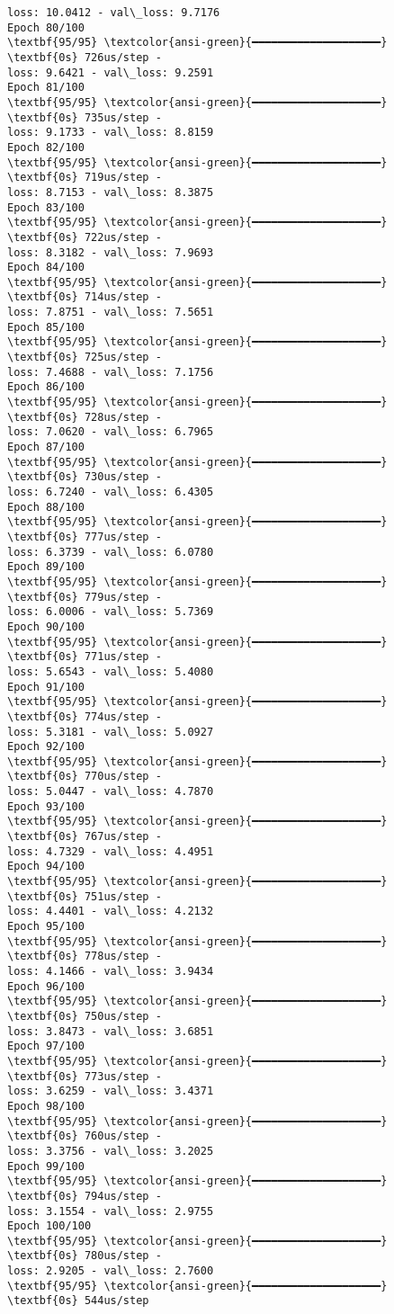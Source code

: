 \documentclass[11pt]{article}
\begin{document}
\begin{Verbatim}[commandchars=\\\{\}]
loss: 10.0412 - val\_loss: 9.7176
Epoch 80/100
\textbf{95/95} \textcolor{ansi-green}{━━━━━━━━━━━━━━━━━━━━} \textbf{0s} 726us/step -
loss: 9.6421 - val\_loss: 9.2591
Epoch 81/100
\textbf{95/95} \textcolor{ansi-green}{━━━━━━━━━━━━━━━━━━━━} \textbf{0s} 735us/step -
loss: 9.1733 - val\_loss: 8.8159
Epoch 82/100
\textbf{95/95} \textcolor{ansi-green}{━━━━━━━━━━━━━━━━━━━━} \textbf{0s} 719us/step -
loss: 8.7153 - val\_loss: 8.3875
Epoch 83/100
\textbf{95/95} \textcolor{ansi-green}{━━━━━━━━━━━━━━━━━━━━} \textbf{0s} 722us/step -
loss: 8.3182 - val\_loss: 7.9693
Epoch 84/100
\textbf{95/95} \textcolor{ansi-green}{━━━━━━━━━━━━━━━━━━━━} \textbf{0s} 714us/step -
loss: 7.8751 - val\_loss: 7.5651
Epoch 85/100
\textbf{95/95} \textcolor{ansi-green}{━━━━━━━━━━━━━━━━━━━━} \textbf{0s} 725us/step -
loss: 7.4688 - val\_loss: 7.1756
Epoch 86/100
\textbf{95/95} \textcolor{ansi-green}{━━━━━━━━━━━━━━━━━━━━} \textbf{0s} 728us/step -
loss: 7.0620 - val\_loss: 6.7965
Epoch 87/100
\textbf{95/95} \textcolor{ansi-green}{━━━━━━━━━━━━━━━━━━━━} \textbf{0s} 730us/step -
loss: 6.7240 - val\_loss: 6.4305
Epoch 88/100
\textbf{95/95} \textcolor{ansi-green}{━━━━━━━━━━━━━━━━━━━━} \textbf{0s} 777us/step -
loss: 6.3739 - val\_loss: 6.0780
Epoch 89/100
\textbf{95/95} \textcolor{ansi-green}{━━━━━━━━━━━━━━━━━━━━} \textbf{0s} 779us/step -
loss: 6.0006 - val\_loss: 5.7369
Epoch 90/100
\textbf{95/95} \textcolor{ansi-green}{━━━━━━━━━━━━━━━━━━━━} \textbf{0s} 771us/step -
loss: 5.6543 - val\_loss: 5.4080
Epoch 91/100
\textbf{95/95} \textcolor{ansi-green}{━━━━━━━━━━━━━━━━━━━━} \textbf{0s} 774us/step -
loss: 5.3181 - val\_loss: 5.0927
Epoch 92/100
\textbf{95/95} \textcolor{ansi-green}{━━━━━━━━━━━━━━━━━━━━} \textbf{0s} 770us/step -
loss: 5.0447 - val\_loss: 4.7870
Epoch 93/100
\textbf{95/95} \textcolor{ansi-green}{━━━━━━━━━━━━━━━━━━━━} \textbf{0s} 767us/step -
loss: 4.7329 - val\_loss: 4.4951
Epoch 94/100
\textbf{95/95} \textcolor{ansi-green}{━━━━━━━━━━━━━━━━━━━━} \textbf{0s} 751us/step -
loss: 4.4401 - val\_loss: 4.2132
Epoch 95/100
\textbf{95/95} \textcolor{ansi-green}{━━━━━━━━━━━━━━━━━━━━} \textbf{0s} 778us/step -
loss: 4.1466 - val\_loss: 3.9434
Epoch 96/100
\textbf{95/95} \textcolor{ansi-green}{━━━━━━━━━━━━━━━━━━━━} \textbf{0s} 750us/step -
loss: 3.8473 - val\_loss: 3.6851
Epoch 97/100
\textbf{95/95} \textcolor{ansi-green}{━━━━━━━━━━━━━━━━━━━━} \textbf{0s} 773us/step -
loss: 3.6259 - val\_loss: 3.4371
Epoch 98/100
\textbf{95/95} \textcolor{ansi-green}{━━━━━━━━━━━━━━━━━━━━} \textbf{0s} 760us/step -
loss: 3.3756 - val\_loss: 3.2025
Epoch 99/100
\textbf{95/95} \textcolor{ansi-green}{━━━━━━━━━━━━━━━━━━━━} \textbf{0s} 794us/step -
loss: 3.1554 - val\_loss: 2.9755
Epoch 100/100
\textbf{95/95} \textcolor{ansi-green}{━━━━━━━━━━━━━━━━━━━━} \textbf{0s} 780us/step -
loss: 2.9205 - val\_loss: 2.7600
\textbf{95/95} \textcolor{ansi-green}{━━━━━━━━━━━━━━━━━━━━} \textbf{0s} 544us/step
    \end{Verbatim}
\end{document}
